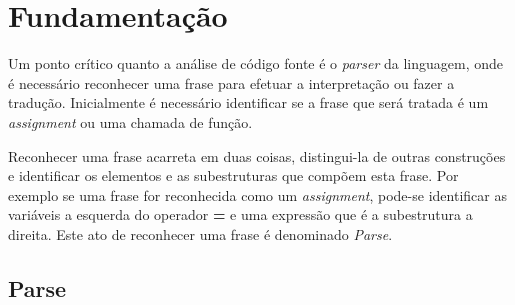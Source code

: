 
%
\chapter{Fundamentação}
Um ponto crítico quanto a análise de código fonte é o \textit{parser} da linguagem, onde é necessário reconhecer uma frase para efetuar a interpretação ou fazer a tradução. Inicialmente é necessário identificar se a frase que será tratada é um \textit{assignment} ou uma chamada de função.
 
Reconhecer uma frase acarreta em duas coisas, distingui-la de outras construções e identificar os elementos e as subestruturas que compõem esta frase. Por exemplo se uma frase for reconhecida como um \textit{assignment}, pode-se identificar as variáveis a esquerda do operador \textbf{=} e uma expressão que é a subestrutura a direita. Este ato de reconhecer uma frase é denominado \textit{Parse}.

\section{Parse}

